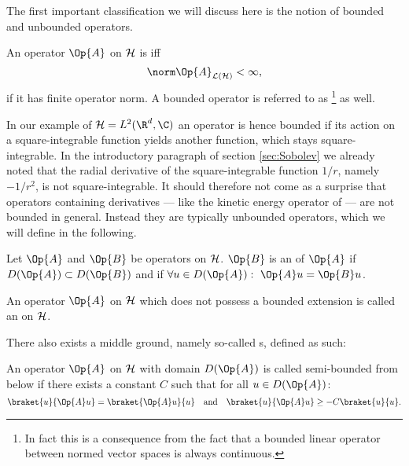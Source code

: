 The first important classification we will discuss here
is the notion of bounded and unbounded operators.
\begin{defn}
	\label{defn:OpBounded}
	An operator $\Op{A}$ on $\mathcal{H}$ is  iff
	\[ \opnorm{\Op{A}} < \infty, \]
	\ie if it has finite operator norm.
	A bounded operator is referred to as %
	\footnote{In fact this is a consequence from the fact that a bounded linear operator
	between normed vector spaces is always continuous.} as well.
\end{defn}
In our example of $\hilbert = L^2(\R^d, \C)$ an operator is hence bounded
if its action on a square-integrable function yields another function,
which stays square-integrable.
In the introductory paragraph of section \vref{sec:Sobolev}
we already noted that the radial derivative of
the square-integrable function $1/r$, namely $-1/r^2$,
is not square-integrable.
It should therefore not come as a surprise that
operators containing derivatives
--- like the kinetic energy operator of \QM ---
are not bounded in general.
Instead they are typically unbounded operators,
which we will define in the following.

\begin{defn}
	Let $\Op{A}$ and $\Op{B}$ be operators on $\mathcal{H}$.
	$\Op{B}$ is an  of $\Op{A}$ if
	\mbox{$D(\Op{A}) \subset D(\Op{B})$}
	and if $\forall u \in D(\Op{A}): \ \Op{A}u = \Op{B}u$.
\end{defn}

\begin{defn}
	An operator $\Op{A}$ on $\mathcal{H}$ which does not possess
	a bounded extension is called an  on $\mathcal{H}$.
\end{defn}

There also exists a middle ground,
namely so-called s, defined as such:
\begin{defn}
	\label{defn:SemiBounded}
	An operator $\Op{A}$ on $\mathcal{H}$ with domain $D(\Op{A})$
	is called semi-bounded from below if there exists a constant $C$
	such that for all $u \in D(\Op{A})$:
	\[ \braket{u}{\Op{A} u} = \braket{\Op{A} u}{u} \quad \text{and}
	\quad \braket{u}{\Op{A} u} \geq -C \braket{u}{u}. \]
\end{defn}

